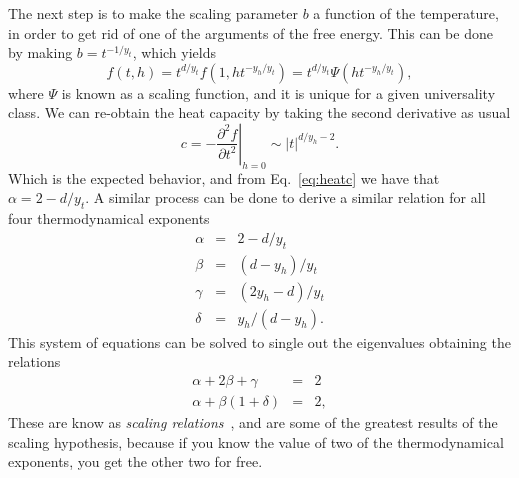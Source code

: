 The next step is to make the scaling parameter $b$ a function of the
temperature, in order to get rid of one of the arguments of the free energy.
This can be done by making $b=t^{-1/y_t}$, which yields
\begin{equation}
    f\left(t,h\right)=
    t^{d/y_{t}}f\left(1,ht^{-y_{h}/y_{t}}\right)=
    t^{d/y_{t}}\Psi\left(ht^{-y_{h}/y_{t}}\right),
\end{equation}
where $\Psi$ is known as a scaling function, and it is unique for a given
universality class. We can re-obtain the heat capacity by taking
the second derivative as usual
\begin{equation}
    c=-\left.\frac{\partial^2 f}{\partial t^2}\right|_{h=0}
    \sim \left|t\right|^{d/y_h-2}.
\end{equation}
Which is the expected behavior, and from Eq.~\ref{eq:heatc} we have that
$\alpha=2-d/y_t$. A similar process can be done to derive a similar relation
for all four thermodynamical exponents
\begin{eqnarray}
    \label{eq:scal1}
    \alpha & = & 2-d/y_{t}\\
    \beta  & = & \left(d-y_{h}\right)/y_{t}\\
    \gamma & = & \left(2y_{h}-d\right)/y_{t}\\
    \label{eq:scal2}
    \delta & = & y_{h}/\left(d-y_{h}\right).
\end{eqnarray}
This system of equations can be solved to single out the eigenvalues obtaining
the relations
\begin{eqnarray}
    \alpha+2\beta+\gamma              & = & 2\\
    \alpha+\beta\left(1+\delta\right) & = & 2,
\end{eqnarray}
These are know as \textit{scaling relations}~\cite{Rushbrooke1963,
Griffiths1967}, and are some of the greatest results of the scaling
hypothesis, because if you know the value of two of the thermodynamical
exponents, you get the other two for free.

